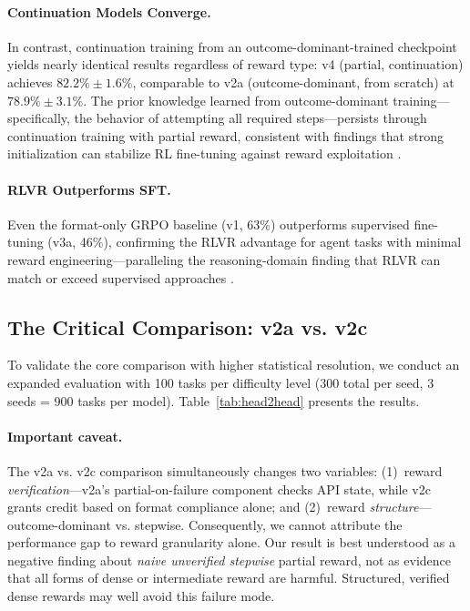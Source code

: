 \documentclass[11pt]{article}
\begin{document}
\paragraph{Continuation Models Converge.}
In contrast, continuation training from an outcome-dominant-trained checkpoint yields nearly identical results regardless of reward type: v4 (partial, continuation) achieves $82.2\% \pm 1.6\%$, comparable to v2a (outcome-dominant, from scratch) at $78.9\% \pm 3.1\%$.
The prior knowledge learned from outcome-dominant training---specifically, the behavior of attempting all required steps---persists through continuation training with partial reward, consistent with findings that strong initialization can stabilize RL fine-tuning against reward exploitation \citep{toolrl2025}.

\paragraph{RLVR Outperforms SFT.}
Even the format-only GRPO baseline (v1, 63\%) outperforms supervised fine-tuning (v3a, 46\%), confirming the RLVR advantage for agent tasks with minimal reward engineering---paralleling the reasoning-domain finding that RLVR can match or exceed supervised approaches \citep{deepseek2025r1,wen2025rlvr}.

\subsection{The Critical Comparison: v2a vs. v2c}
\label{sec:head2head}

To validate the core comparison with higher statistical resolution, we conduct an expanded evaluation with 100 tasks per difficulty level (300 total per seed, 3 seeds = 900 tasks per model).
Table~\ref{tab:head2head} presents the results.

\paragraph{Important caveat.}
The v2a vs. v2c comparison simultaneously changes two variables: (1)~reward \emph{verification}---v2a's partial-on-failure component checks API state, while v2c grants credit based on format compliance alone; and (2)~reward \emph{structure}---outcome-dominant vs. stepwise.
Consequently, we cannot attribute the performance gap to reward granularity alone.
Our result is best understood as a negative finding about \emph{naive unverified stepwise} partial reward, not as evidence that all forms of dense or intermediate reward are harmful.
Structured, verified dense rewards \citep{cm2_2025,admire2025,chen2026milestones} may well avoid this failure mode.
\end{document}
